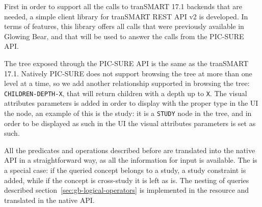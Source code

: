 First in order to support all the calls to tranSMART 17.1 backends that are needed, a simple client library for tranSMART REST API v2 is developed.
In terms of features, this library offers all calls that were previously available in Glowing Bear, and that will be used to answer the calls from the PIC-SURE API.

The tree exposed through the PIC-SURE API is the same as the tranSMART 17.1.
Natively PIC-SURE does not support browsing the tree at more than one level at a time, so we add another relationship supported in browsing the tree: \verb|CHILDREN-DEPTH-X|, that will return children with a depth up to \verb|X|.
The visual attributes parameters is added in order to display with the proper type in the UI the node, an example of this is the study: it is a \verb|STUDY| node in the tree, and in order to be displayed as such in the UI the visual attributes parameters is set as such.

All the predicates and operations described before are translated into the native API in a straightforward way, as all the information for input is available.
The is a special case: if the queried concept belongs to a study, a study constraint is added, while if the concept is cross-study it is left as is.
The nesting of queries described section~\ref{sec:gb-logical-operators} is implemented in the resource and translated in the native API.




